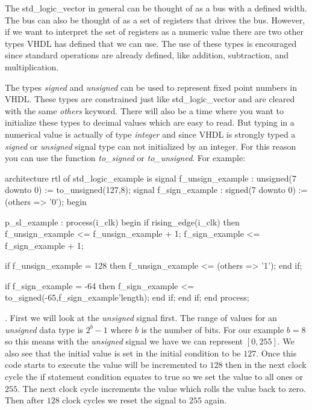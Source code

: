 The std\_logic\_vector in general can be thought of as a bus with a defined width. The bus can also be thought of as a set of registers that drives the bus. However, if we want to interpret the set of registers as a numeric value there are two other types \ac{VHDL} has defined that we can use. The use of these types is encouraged since standard operations are already defined, like addition, subtraction, and multiplication. 

The types \emph{signed} and \emph{unsigned} can be used to represent fixed point numbers in \ac{VHDL}. These types are constrained just like std\_logic\_vector and are cleared with the same \emph{others} keyword. There will also be a time where you want to initialize these types to decimal values which are easy to read. But typing in a numerical value is actually of type \emph{integer} and since \ac{VHDL} is strongly typed a \emph{signed} or \emph{unsigned} signal type can not initialized by an integer. For this reason you can use the function \emph{to\_signed} or \emph{to\_unsigned}. For example:

\begin{VHDLlisting}[tabsize=4]
architecture rtl of std_logic_example is
  signal f_unsign_example : unsigned(7 downto 0) := to_unsigned(127,8);
  signal f_sign_example : signed(7 downto 0)   := (others => '0');
begin

p_sl_example : process(i_clk)
begin
    if rising_edge(i_clk) then
        f_unsign_example <= f_unsign_example + 1;
        f_sign_example   <= f_sign_example   + 1;
        
        if f_unsign_example = 128 then
            f_unsign_example <= (others => '1');
        end if;
        
        if f_sign_example = -64 then
            f_sign_example <= to_signed(-65,f_sign_example'length);
        end if;		
    end if;
end process;
\end{VHDLlisting}

. First we will look at the \emph{unsigned} signal first. The range of values for an \emph{unsigned} data type is $2^b-1$ where $b$ is the number of bits. For our example $b=8$ so this means with the \emph{unsigned} signal we have we can represent $[0,255]$. We also see that the initial value is set in the initial condition to be $127$. Once this code starts to execute the value will be incremented to $128$ then in the next clock cycle the if statement condition equates to true so we set the value to all ones or $255$. The next clock cycle increments the value which rolls the value back to zero. Then after $128$ clock cycles we reset the signal to $255$ again. 

